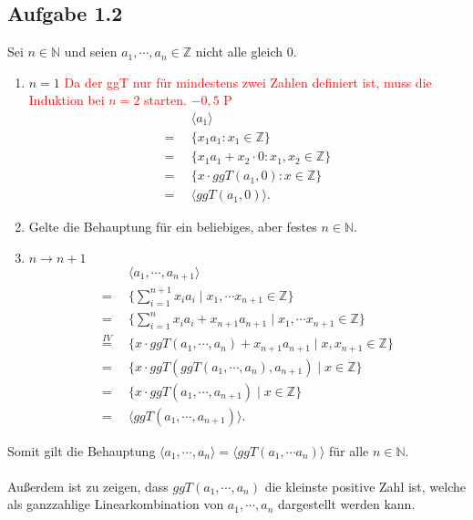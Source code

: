 \documentclass[12pt]{article}
\newcommand{\corr}[1]{\textcolor{red}{#1}}
\begin{document}
\subsection*{Aufgabe 1.2}
Sei $n \in \mathbb{N}$ und seien $a_1, \cdots, a_n \in \mathbb{Z}$ nicht alle gleich $0$.
\begin{enumerate}
	\item[\framebox{\textbf{IA}}] \underline{$n = 1$} \corr{Da der ggT nur für mindestens zwei Zahlen definiert ist, muss die Induktion bei $n=2$ starten. $-0,5$ P}
	\begin{align*}
		&\langle a_1 \rangle \\
		= \enspace &\{x_1 a_1 : x_1 \in \mathbb{Z}\} \\
		= \enspace &\{x_1 a_1 + x_2 \cdot 0 : x_1, x_2 \in \mathbb{Z}\} \\
		= \enspace &\{x \cdot ggT(a_1, 0) : x \in \mathbb{Z}\} \\
		= \enspace &\langle ggT(a_1, 0) \rangle.
	\end{align*}
	
	\item[\framebox{\textbf{IV}}] Gelte die Behauptung für ein beliebiges, aber festes $n \in \mathbb{N}$.
	
	\item[\framebox{\textbf{IS}}] \underline{$n \rightarrow n + 1$}
	\begin{align*}
		&\langle a_1, \cdots, a_{n+1} \rangle \\
		= \enspace &\{\sum_{i=1}^{n+1}x_i a_i \mid x_1, \cdots x_{n+1} \in \mathbb{Z}\} \\
		= \enspace &\{\sum_{i=1}^{n}x_i a_i + x_{n+1} a_{n+1} \mid x_1, \cdots x_{n+1} \in \mathbb{Z}\} \\
		\overset{IV}{=}  \enspace &\{x \cdot ggT(a_1, \cdots, a_n) + x_{n+1} a_{n+1} \mid x, x_{n+1} \in \mathbb{Z}\} \\
		= \enspace &\{x \cdot ggT(ggT(a_1, \cdots, a_n), a_{n+1}) \mid x \in \mathbb{Z}\} \\
		= \enspace &\{x \cdot ggT(a_1, \cdots, a_{n+1}) \mid x \in \mathbb{Z}\} \\
		= \enspace &\langle ggT(a_1, \cdots, a_{n+1}) \rangle.
	\end{align*}
\end{enumerate}
Somit gilt die Behauptung $\langle a_1, \cdots, a_n \rangle = \langle ggT(a_1, \cdots a_n) \rangle$ für alle $n \in \mathbb{N}$. \\\\
Außerdem ist zu zeigen, dass $ggT(a_1, \cdots, a_n)$ die kleinste positive Zahl ist, welche als ganzzahlige Linearkombination von $a_1, \cdots, a_n$ dargestellt werden kann. \\\\
\end{document}
